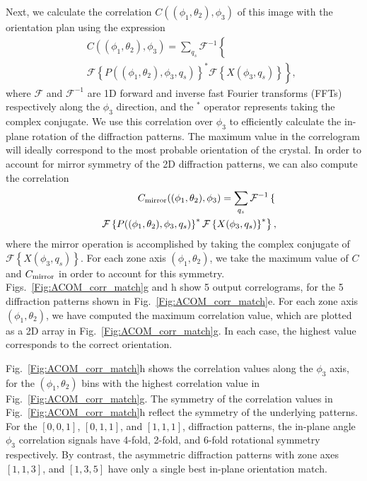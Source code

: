 \documentclass[%
 superscriptaddress,
 aip,
 amsmath,amssymb,
reprint,%
 author-year,%
longbibliography
]{revtex4-2}
\newcommand{\ft}{\mathcal{F}}
\newcommand{\ift}{\mathcal{F}^{-1}}
\begin{document}
Next, we calculate the correlation $C((\phi_1, \theta_2), \phi_3)$ of this image with the orientation plan using the expression
\begin{eqnarray}
    && C((\phi_1, \theta_2), \phi_3) 
    = 
    \sum_{q_s}
    \ift \left\{  \right.
    \nonumber \\
    &&
    \left.
        \ft\left\{ 
        {P((\phi_1, \theta_2), \phi_3, q_s)}
        \right\}^*
        \ft\left\{ 
        X(\phi_3, q_s)
        \right\}
    \right\},
    \nonumber 
\end{eqnarray}
where $\ft$ and $\ift$ are 1D forward and inverse fast Fourier transforms (FFTs) respectively along the $\phi_3$ direction, and the ${}^*$ operator represents taking the complex conjugate. We use this correlation over $\phi_3$ to efficiently calculate the in-plane rotation of the diffraction patterns. The maximum value in the correlogram will ideally correspond to the most probable orientation of the crystal. In order to account for mirror symmetry of the 2D diffraction patterns, we can also compute the correlation 
\begin{eqnarray}
    && C_{\rm{mirror}}((\phi_1, \theta_2), \phi_3) 
    = 
    \sum_{q_s}
    \ift \left\{  \right.
    \nonumber \\
    &&
    \left.
        \ft\left\{ 
        {P((\phi_1, \theta_2), \phi_3, q_s)}
        \right\}^*
        \ft\left\{ 
        X(\phi_3, q_s)
        \right\}^*
    \right\},
    \nonumber 
\end{eqnarray}
where the mirror operation is accomplished by taking the complex conjugate of $\ft\left\{X(\phi_3, q_s)\right\}$. For each zone axis $(\phi_1, \theta_2)$, we take the maximum value of $C$ and $C_{\rm{mirror}}$ in order to account for this symmetry. Figs.~\ref{Fig:ACOM_corr_match}g and h show 5 output correlograms, for the 5 diffraction patterns shown in Fig.~\ref{Fig:ACOM_corr_match}e. For each zone axis $(\phi_1, \theta_2)$, we have computed the maximum correlation value, which are plotted as a 2D array in Fig.~\ref{Fig:ACOM_corr_match}g. In each case, the highest value corresponds to the correct orientation. 

Fig.~\ref{Fig:ACOM_corr_match}h shows the correlation values along the $\phi_3$ axis, for the $(\phi_1, \theta_2)$ bins with the highest correlation value in Fig.~\ref{Fig:ACOM_corr_match}g. The symmetry of the correlation values in Fig.~\ref{Fig:ACOM_corr_match}h reflect the symmetry of the underlying patterns. For the $[0,0,1]$, $[0,1,1]$, and $[1,1,1]$, diffraction patterns, the in-plane angle $\phi_3$ correlation signals have 4-fold, 2-fold, and 6-fold rotational symmetry respectively. By contrast, the asymmetric diffraction patterns with zone axes $[1,1,3]$, and $[1,3,5]$ have only a single best in-plane orientation match.
\end{document}
